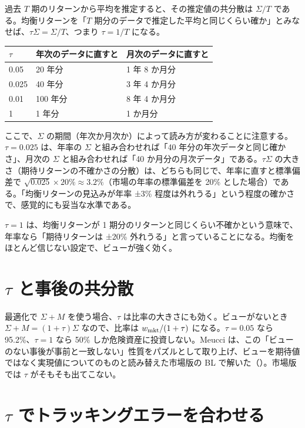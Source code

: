 過去 $T$ 期のリターンから平均を推定すると、その推定値の共分散は $\Sigma/T$ である。均衡リターンを「$T$ 期分のデータで推定した平均と同じくらい確か」とみなせば、$\tau\Sigma=\Sigma/T$、つまり $\tau=1/T$ になる。

\begin{center}
\small
\begin{tabular}{lll}
\toprule
$\tau$ & 年次のデータに直すと & 月次のデータに直すと \\
\midrule
0.05 & 20 年分 & 1 年 8 か月分 \\
0.025 & 40 年分 & 3 年 4 か月分 \\
0.01 & 100 年分 & 8 年 4 か月分 \\
1 & 1 年分 & 1 か月分 \\
\bottomrule
\end{tabular}
\end{center}

ここで、$\Sigma$ の期間（年次か月次か）によって読み方が変わることに注意する。$\tau=0.025$ は、年率の $\Sigma$ と組み合わせれば「40 年分の年次データと同じ確かさ」、月次の $\Sigma$ と組み合わせれば「40 か月分の月次データ」である。$\tau\Sigma$ の大きさ（期待リターンの不確かさの分散）は、どちらも同じで、年率に直すと標準偏差で $\sqrt{0.025}\times20\%\approx3.2\%$（市場の年率の標準偏差を 20\% とした場合）である。「均衡リターンの見込みが年率 ±3\% 程度は外れうる」という程度の確かさで、感覚的にも妥当な水準である。

$\tau=1$ は、均衡リターンが 1 期分のリターンと同じくらい不確かという意味で、年率なら「期待リターンは ±20\% 外れうる」と言っていることになる。均衡をほとんど信じない設定で、ビューが強く効く。

\section{$\tau$ と事後の共分散}

最適化で $\Sigma+M$ を使う場合、$\tau$ は比率の大きさにも効く。ビューがないとき $\Sigma+M=(1+\tau)\Sigma$ なので、比率は $w_{\mathrm{mkt}}/(1+\tau)$ になる。$\tau=0.05$ なら 95.2\%、$\tau=1$ なら 50\% しか危険資産に投資しない。Meucci は、この「ビューのない事後が事前と一致しない」性質をパズルとして取り上げ、ビューを期待値ではなく実現値についてのものと読み替えた市場版の BL で解いた（）。市場版では $\tau$ がそもそも出てこない。

\section{$\tau$ でトラッキングエラーを合わせる}\label{sec:tau-te}

